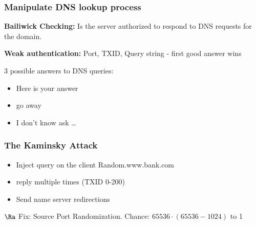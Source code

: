 \documentclass[fs, footer]{latex4ei}
\begin{document}
\begin{multicols*}{4}
{\subsubsection{Manipulate DNS lookup process}

\textbf{Bailiwick Checking:} Is the server authorized to respond to DNS requests for the domain.

\textbf{Weak authentication:} Port, TXID, Query string - first good answer wins

3 possible answers to DNS queries:
\begin{itemize}
   	\item Here is your answer
   	\item go away
   	\item I don't know ask \ldots
\end{itemize}   


\subsubsection{The Kaminsky Attack}
\begin{itemize}
	\item Inject query on the client Random.www.bank.com
	\item reply multiple times  (TXID 0-200)
	\item Send name server redirections
\end{itemize}
$\Ra$ Fix: Source Port Randomization. Chance: $65536 \cdot (65536 - 1024)$ to 1
}



\end{multicols*}
\end{document}
